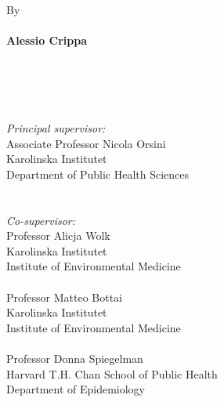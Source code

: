 %
\null
\vspace{1.5cm}
\\
\\
\\
\\
\\
By
\\
\\
{\Large \textbf{\textsf{Alessio Crippa}}}
\\
\\
\\
\\
\\
\begin{minipage}[t]{6.25cm}
\singlespacing
{\small
\textit{Principal supervisor:}\\
Associate Professor Nicola Orsini \\
Karolinska Institutet \\
Department of Public Health Sciences \\
\\
\\
\textit{Co-supervisor:}\\
Professor Alicja Wolk \\
Karolinska Institutet \\
Institute of Environmental Medicine \\
\\
Professor Matteo Bottai \\
Karolinska Institutet \\
Institute of Environmental Medicine \\
\\
Professor Donna Spiegelman \\
Harvard T.H. Chan School of Public Health \\
Department of Epidemiology \\
}
\end{minipage}
\hspace{1.5cm}
